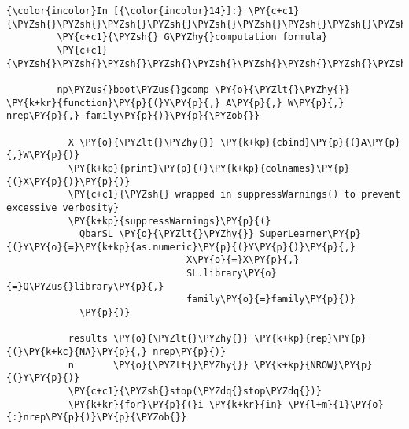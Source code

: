    \begin{Verbatim}[commandchars=\\\{\}]
{\color{incolor}In [{\color{incolor}14}]:} \PY{c+c1}{\PYZsh{}\PYZsh{}\PYZsh{}\PYZsh{}\PYZsh{}\PYZsh{}\PYZsh{}\PYZsh{}\PYZsh{}\PYZsh{}\PYZsh{}\PYZsh{}\PYZsh{}\PYZsh{}\PYZsh{}\PYZsh{}\PYZsh{}\PYZsh{}\PYZsh{}\PYZsh{}\PYZsh{}\PYZsh{}\PYZsh{}\PYZsh{}\PYZsh{}\PYZsh{}\PYZsh{}\PYZsh{}\PYZsh{}\PYZsh{}\PYZsh{}\PYZsh{}\PYZsh{}\PYZsh{}\PYZsh{}\PYZsh{}\PYZsh{}\PYZsh{}\PYZsh{}\PYZsh{}\PYZsh{}\PYZsh{}\PYZsh{}\PYZsh{}\PYZsh{}\PYZsh{}\PYZsh{}\PYZsh{}\PYZsh{}\PYZsh{}\PYZsh{}\PYZsh{}\PYZsh{}\PYZsh{}\PYZsh{}\PYZsh{}\PYZsh{}\PYZsh{}\PYZsh{}\PYZsh{}\PYZsh{}}
         \PY{c+c1}{\PYZsh{} G\PYZhy{}computation formula}
         \PY{c+c1}{\PYZsh{}\PYZsh{}\PYZsh{}\PYZsh{}\PYZsh{}\PYZsh{}\PYZsh{}\PYZsh{}\PYZsh{}\PYZsh{}\PYZsh{}\PYZsh{}\PYZsh{}\PYZsh{}\PYZsh{}\PYZsh{}\PYZsh{}\PYZsh{}\PYZsh{}\PYZsh{}\PYZsh{}\PYZsh{}\PYZsh{}\PYZsh{}\PYZsh{}\PYZsh{}\PYZsh{}\PYZsh{}\PYZsh{}\PYZsh{}\PYZsh{}\PYZsh{}\PYZsh{}\PYZsh{}\PYZsh{}\PYZsh{}\PYZsh{}\PYZsh{}\PYZsh{}\PYZsh{}\PYZsh{}\PYZsh{}\PYZsh{}\PYZsh{}\PYZsh{}\PYZsh{}\PYZsh{}\PYZsh{}\PYZsh{}\PYZsh{}\PYZsh{}\PYZsh{}\PYZsh{}\PYZsh{}\PYZsh{}\PYZsh{}\PYZsh{}\PYZsh{}\PYZsh{}\PYZsh{}\PYZsh{}}
         
         np\PYZus{}boot\PYZus{}gcomp \PY{o}{\PYZlt{}\PYZhy{}} \PY{k+kr}{function}\PY{p}{(}Y\PY{p}{,} A\PY{p}{,} W\PY{p}{,} nrep\PY{p}{,} family\PY{p}{)}\PY{p}{\PYZob{}}
             
           X \PY{o}{\PYZlt{}\PYZhy{}} \PY{k+kp}{cbind}\PY{p}{(}A\PY{p}{,}W\PY{p}{)}
           \PY{k+kp}{print}\PY{p}{(}\PY{k+kp}{colnames}\PY{p}{(}X\PY{p}{)}\PY{p}{)}
           \PY{c+c1}{\PYZsh{} wrapped in suppressWarnings() to prevent excessive verbosity}
           \PY{k+kp}{suppressWarnings}\PY{p}{(}
             QbarSL \PY{o}{\PYZlt{}\PYZhy{}} SuperLearner\PY{p}{(}Y\PY{o}{=}\PY{k+kp}{as.numeric}\PY{p}{(}Y\PY{p}{)}\PY{p}{,}
                                X\PY{o}{=}X\PY{p}{,}
                                SL.library\PY{o}{=}Q\PYZus{}library\PY{p}{,}
                                family\PY{o}{=}family\PY{p}{)}
             \PY{p}{)} 
             
           results \PY{o}{\PYZlt{}\PYZhy{}} \PY{k+kp}{rep}\PY{p}{(}\PY{k+kc}{NA}\PY{p}{,} nrep\PY{p}{)}
           n       \PY{o}{\PYZlt{}\PYZhy{}} \PY{k+kp}{NROW}\PY{p}{(}Y\PY{p}{)}
           \PY{c+c1}{\PYZsh{}stop(\PYZdq{}stop\PYZdq{})}
           \PY{k+kr}{for}\PY{p}{(}i \PY{k+kr}{in} \PY{l+m}{1}\PY{o}{:}nrep\PY{p}{)}\PY{p}{\PYZob{}}
               

\end{Verbatim}
